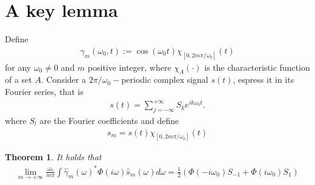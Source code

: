 \documentclass[a4paper,10pt]{article}
\newcommand{\w}{\omega}
\newtheorem{thm}{Theorem}[section]
\begin{document}
\section{A key lemma}
Define
\begin{align}
	\gamma_m(\w_0,t):=\cos(\w_0 t) \chi_{[0, 2m\pi/\w_0]}(t)
\end{align}
for any $\w_0\neq 0$ and $m$ positive integer, where $\chi_{A}(\cdot)$ is the characteristic function of a set $A$.
Consider a $2\pi/\w_0-$periodic complex signal $s(t)$, espress it in its Fourier series, that is
\begin{align}
	s(t)=\sum_{j=-\infty}^{+\infty}S_k e^{ik\w_0 t}.
\end{align}
where $S_l$ are the Fourier coefficients and define
\begin{align}
	s_m=s(t)\chi_{[0, 2m\pi/\w_0]}(t)
\end{align}
\begin{thm}
	It holds that
	\begin{align}
		\lim_{m\rightarrow +\infty}
			\frac{\w_0}{m\pi}\int \hat \gamma_m(\w)^* \Phi(i\w) \hat s_m(\w)d\w=
				\frac{1}{2}\left(\Phi(-i\w_0)S_{-1}+\Phi(i\w_0)S_1\right)
	\end{align}
\end{thm}
\end{document}
